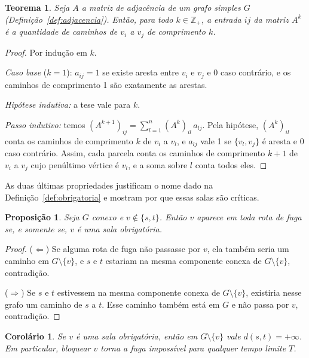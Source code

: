 \documentclass{article}
\theoremstyle{definition}
\theoremstyle{plain}
\newtheorem{teorema}[definicao]{Teorema}
\newtheorem{proposicao}[definicao]{Proposição}
\newtheorem{corolario}[definicao]{Corolário}
\begin{document}
\begin{teorema}\label{teo:potencias}
Seja $A$ a matriz de adjacência de um grafo simples $G$
(Definição~\ref{def:adjacencia}). Então, para todo $k \in \mathbb{Z}_+$, a entrada
$ij$ da matriz $A^k$ é a quantidade de caminhos de $v_i$ a $v_j$ de comprimento $k$.
\end{teorema}

\begin{proof}
Por indução em $k$.

\emph{Caso base} ($k = 1$): $a_{ij} = 1$ se existe aresta entre $v_i$ e $v_j$ e
$0$ caso contrário, e os caminhos de comprimento 1 são exatamente as arestas.

\emph{Hipótese indutiva:} a tese vale para $k$.

\emph{Passo indutivo:} temos $(A^{k+1})_{ij} = \sum_{l=1}^{n} (A^k)_{il}\, a_{lj}$.
Pela hipótese, $(A^k)_{il}$ conta os caminhos de comprimento $k$ de $v_i$ a $v_l$,
e $a_{lj}$ vale 1 se $\{v_l, v_j\}$ é aresta e 0 caso contrário. Assim, cada
parcela conta os caminhos de comprimento $k+1$ de $v_i$ a $v_j$ cujo penúltimo
vértice é $v_l$, e a soma sobre $l$ conta todos eles.
\end{proof}

As duas últimas propriedades justificam o nome dado na
Definição~\ref{def:obrigatoria} e mostram por que essas salas são críticas.

\begin{proposicao}\label{prop:obrigatoria}
Seja $G$ conexo e $v \notin \{s,t\}$. Então $v$ aparece em toda rota de fuga se, e
somente se, $v$ é uma sala obrigatória.
\end{proposicao}

\begin{proof}
($\Leftarrow$) Se alguma rota de fuga não passasse por $v$, ela também seria um
caminho em $G \setminus \{v\}$, e $s$ e $t$ estariam na mesma componente conexa de
$G \setminus \{v\}$, contradição.

($\Rightarrow$) Se $s$ e $t$ estivessem na mesma componente conexa de
$G \setminus \{v\}$, existiria nesse grafo um caminho de $s$ a $t$. Esse caminho
também está em $G$ e não passa por $v$, contradição.
\end{proof}

\begin{corolario}\label{cor:bloqueio}
Se $v$ é uma sala obrigatória, então em $G \setminus \{v\}$ vale
$d(s,t) = +\infty$. Em particular, bloquear $v$ torna a fuga impossível para
qualquer tempo limite $T$.
\end{corolario}
\end{document}
